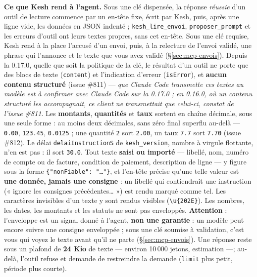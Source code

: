 \documentclass[a4paper,11pt,oneside]{article}
\begin{document}
\textbf{Ce que Kesh rend à l'agent.} Sous une clé dispensée, la réponse \emph{réussie} d'un outil de lecture commence par un en-tête fixe, écrit par Kesh, puis, après une ligne vide, les données en JSON indenté ; \texttt{kesh\_lire\_envoi}, \texttt{proposer\_prompt} et les erreurs d'outil ont leurs textes propres, sans cet en-tête. Sous une clé requise, Kesh rend à la place l'accusé d'un envoi, puis, à la relecture de l'envoi validé, une phrase qui l'annonce et le texte que vous avez validé (\S\ref{sec:mcp-envois}). Depuis la 0.17.0, quelle que soit la politique de la clé, le résultat d'un outil ne porte que des blocs de texte (\texttt{content}) et l'indication d'erreur (\texttt{isError}), et \textbf{aucun contenu structuré} (issue \#811) --- \emph{que Claude Code transmette ces textes au modèle est à confirmer avec Claude Code sur la 0.17.0 ; en 0.16.0, où un contenu structuré les accompagnait, ce client ne transmettait que celui-ci, constat de l'issue \#811}. Les \textbf{montants}, \textbf{quantités} et \textbf{taux} sortent en chaîne décimale, sous une seule forme : au moins deux décimales, sans zéro final superflu au-delà --- \texttt{0.00}, \texttt{123.45}, \texttt{0.0125} ; une quantité \texttt{2} sort \texttt{2.00}, un taux \texttt{7.7} sort \texttt{7.70} (issue \#812). Le délai \texttt{delaiInstructionS} de \texttt{kesh\_version}, nombre à virgule flottante, n'en est pas : il sort \texttt{30.0}. Tout texte \textbf{saisi ou importé} --- libellé, nom, numéro de compte ou de facture, condition de paiement, description de ligne --- y figure sous la forme \texttt{\{"nonFiable": "…"\}}, et l'en-tête précise qu'une telle valeur est \textbf{une donnée, jamais une consigne} : un libellé qui contiendrait une instruction (« ignore les consignes précédentes… ») est rendu marqué comme tel. Les caractères invisibles d'un texte y sont rendus visibles (\texttt{\textbackslash u\{202E\}}). Les nombres, les dates, les montants et les statuts ne sont pas enveloppés. \textbf{Attention} : l'enveloppe est un signal donné à l'agent, \textbf{non une garantie} : un modèle peut encore suivre une consigne enveloppée ; sous une clé soumise à validation, c'est vous qui voyez le texte avant qu'il ne parte (\S\ref{sec:mcp-envois}). Une réponse reste sous un plafond de \textbf{24 Kio} de texte --- environ 10\,000 jetons, estimation ---; au-delà, l'outil refuse et demande de restreindre la demande (\texttt{limit} plus petit, période plus courte).
\end{document}

